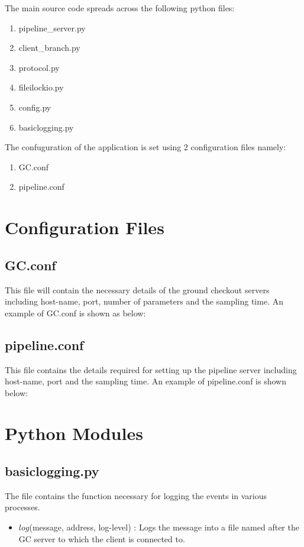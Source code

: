 The main source code spreads across the following python files:
\begin{enumerate}
	\item pipeline\_server.py
	\item client\_branch.py
	\item protocol.py
	\item fileilockio.py
	\item config.py
	\item basiclogging.py
\end{enumerate}
The confuguration of the application is set using 2 configuration files namely:
\begin{enumerate}
	\item GC.conf
	\item pipeline.conf
\end{enumerate}

\section{Configuration Files}

\subsection{GC.conf}
This file will contain the necessary details of the ground checkout servers
including host-name, port, number of parameters and the sampling time. An example
of GC.conf is shown as below:


\subsection{pipeline.conf}
This file contains the details required for setting up the pipeline server
including host-name, port and the sampling time. An example of pipeline.conf is
shown below:



\section{Python Modules}

\subsection{basiclogging.py}
The file contains the function necessary for logging the events in various
processes.
\begin{itemize}
	\item $log$(message, address, log-level) : Logs the message
			into a file named after the GC server to which the client is
			connected to.
\end{itemize}

